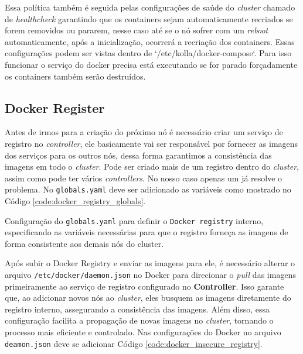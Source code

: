 Essa política também é seguida pelas configurações de saúde do \textit{cluster} chamado de \textit{healthcheck} garantindo que os containers sejam automaticamente recriados se forem removidos ou pararem, nesse caso até se o nó sofrer com um \textit{reboot} automaticamente, após a inicialização, ocorrerá a recriação dos containers. Essas configurações podem ser vistas dentro de `/etc/kolla/docker-compose`. Para isso funcionar o serviço do docker precisa está executando se for parado forçadamente os containers também serão destruídos.

\subsection{Docker Register}
Antes de irmos para a criação do próximo nó é necessário criar um serviço de registro no \textit{controller}, ele basicamente vai ser responsável por fornecer as imagens dos serviços para os outros nós, dessa forma garantimos a consistência das imagens em todo o \textit{cluster}. Pode ser criado mais de um registro dentro do \textit{cluster}, assim como pode ter vários \textit{controllers}. No nosso caso apenas um já resolve o problema. No \texttt{globals.yaml} deve ser adicionado as variáveis como mostrado no Código \ref{code:docker_registry_globals}.

\begin{listing}[h!]
    \noindent{}  
  \caption{Configuração do \texttt{globals.yaml} para definir o \texttt{Docker registry} interno, especificando as variáveis necessárias para que o registro forneça as imagens de forma consistente aos demais nós do cluster.}
  \label{code:docker_registry_globals}
\end{listing}


Após subir o Docker Registry e enviar as imagens para ele, é necessário alterar o arquivo \texttt{/etc/docker/daemon.json} no Docker para direcionar o \textit{pull} das imagens primeiramente ao serviço de registro configurado no \textbf{Controller}. Isso garante que, ao adicionar novos nós ao \textit{cluster}, eles busquem as imagens diretamente do registro interno, assegurando a consistência das imagens. Além disso, essa configuração facilita a propagação de novas imagens no \textit{cluster}, tornando o processo mais eficiente e controlado. Nas configurações do Docker no arquivo \texttt{deamon.json} deve se adicionar Código \ref{code:docker_insecure_registry}.


